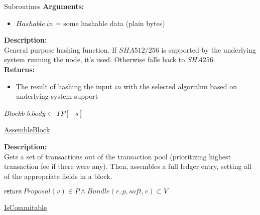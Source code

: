 \documentclass[10pt,a4paper]{article}
\begin{document}
\begin{section}{Subroutines}
\noindent \textbf{Arguments:}
\begin{itemize}
    \item $Hashable \ in$ = some hashable data (plain bytes)
  \end{itemize}

\noindent \textbf{Description:}\\
General purpose hashing function. If $SHA512/256$ is supported by the underlying system running the node, it's used.
Otherwise falls back to $SHA256$.\\

\noindent \textbf{Returns:}
\begin{itemize}
    \item The result of hashing the input $in$ with the selected algorithm based on underlying system support
  \end{itemize}


\begin{algorithm}[H]
    \begin{algorithmic}[1]

    \State $Block b$
    \State $b.body \gets TP[-s]$

    \EndFunction
    \end{algorithmic}
    \caption{\underline{AssembleBlock}}
\end{algorithm}

\noindent \textbf{Description:}\\
Gets a set of transactions out of the transaction pool (prioritizing highest transaction fee if there were any).
Then, assembles a full ledger entry, setting all of the appropriate fields in a block.


\begin{algorithm}[H]
    \begin{algorithmic}[1]

    \State $\mathsf{return} \ Proposal(v) \in P \land Bundle(r,p,soft,v) \subset V$

    \EndFunction
    \end{algorithmic}
    \caption{\underline{IsCommitable}}
\end{algorithm}



\end{section}
\end{document}
